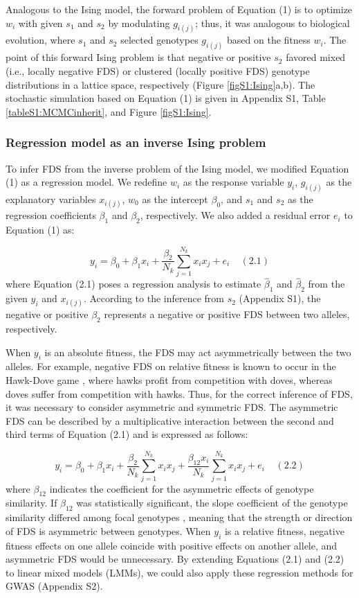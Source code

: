 \documentclass[12pt,]{article}
\begin{document}
Analogous to the Ising model, the forward problem of Equation (1) is to optimize $w_i$ with given $s_1$ and $s_2$ by modulating $g_{i(j)}$; thus, it was analogous to biological evolution, where $s_1$ and $s_2$ selected genotypes $g_{i(j)}$ based on the fitness $w_i$. The point of this forward Ising problem is that negative or positive $s_2$ favored mixed (i.e., locally negative FDS) or clustered (locally positive FDS) genotype distributions in a lattice space, respectively (Figure \ref{figS1:Ising}a,b). The stochastic simulation based on Equation (1) is given in Appendix S1, Table \ref{tableS1:MCMCinherit}, and Figure \ref{figS1:Ising}.


\subsubsection{Regression model as an inverse Ising problem}

To infer FDS from the inverse problem of the Ising model, we modified Equation (1) as a regression model. We redefine $w_i$ as the response variable $y_i$, $g_{i(j)}$ as the explanatory variables $x_{i(j)}$, $w_0$ as the intercept $\beta_0$, and $s_1$ and $s_2$ as the regression coefficients $\beta_1$ and $\beta_2$, respectively. We also added a residual error $e_i$ to Equation (1) as: 

$$y_i = \beta_0 + \beta_1x_i + \frac{\beta_2}{N_k}\sum^{N_{k}}_{j=1}{x_ix_j} + e_i~~~~~(2.1)$$
where Equation (2.1) poses a regression analysis to estimate $\hat{\beta}_1$ and $\hat{\beta}_2$ from the given $y_i$ and $x_{i(j)}$. According to the inference from $s_2$ (Appendix S1), the negative or positive $\beta_2$ represents a negative or positive FDS between two alleles, respectively. 

When $y_i$ is an absolute fitness, the FDS may act asymmetrically between the two alleles. For example, negative FDS on relative fitness is known to occur in the Hawk-Dove game \citep{takahashi2018balanced}, where hawks profit from competition with doves, whereas doves suffer from competition with hawks. Thus, for the correct inference of FDS, it was necessary to consider asymmetric and symmetric FDS. The asymmetric FDS can be described by a multiplicative interaction between the second and third terms of Equation (2.1) \citep{sato2019neighbor} and is expressed as follows:

$$y_i = \beta_0 + \beta_1x_i + \frac{\beta_2}{N_k}\sum^{N_{k}}_{j=1}{x_ix_j} + \frac{\beta_{12}x_i}{N_k}\sum^{N_{k}}_{j=1}{x_ix_j} + e_i~~~~~(2.2)$$
where $\beta_{12}$ indicates the coefficient for the asymmetric effects of genotype similarity. If $\beta_{12}$ was statistically significant, the slope coefficient of the genotype similarity differed among focal genotypes \citep{sato2019neighbor}, meaning that the strength or direction of FDS is asymmetric between genotypes. When $y_i$ is a relative fitness, negative fitness effects on one allele coincide with positive effects on another allele, and asymmetric FDS would be unnecessary. By extending Equations (2.1) and (2.2) to linear mixed models (LMMs), we could also apply these regression methods for GWAS (Appendix S2).
\end{document}
